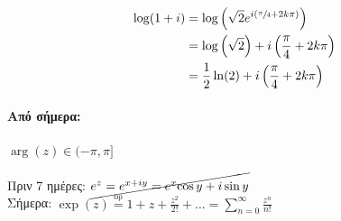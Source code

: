 \documentclass[12pt,a4paper,notitlepage,fleqn]{article}
\begin{document}
    \begin{align*}
    \log(1+i) &= \log\left(
        \sqrt{2}e^{i\left(\sfrac{\pi}{4}+2k\pi \right)}
    \right) \\ &=
    \log\left(\sqrt{2}\right) + i\left( \frac{\pi}{4} +2k\pi \right)
    \\ &=     \frac{1}{2}\ln(2) + i\left( \frac{\pi}{4} +2 k \pi \right)
    \end{align*}

    \paragraph{Από σήμερα:} \( \arg(z) \in (-\pi,\pi] \)

    Πριν 7 ημέρες: \( \cancel{e^z=e^{x+iy}=e^x{\cos y+i\sin y}} \) \\

    Σήμερα: \( \exp(z) \overset{\text{ορ}}{=}
    1+z+\frac{z^2}{2!}+\dots=\sum_{n=0}^\infty \frac{z^n}{n!} \)
\end{document}
